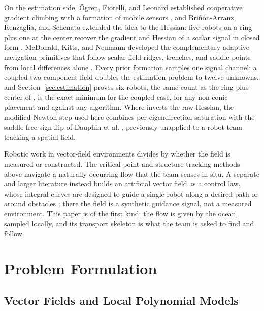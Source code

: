 \documentclass[lettersize,journal]{IEEEtran}
\begin{document}
On the estimation side, \"{O}gren, Fiorelli, and Leonard established
cooperative gradient climbing with a formation of mobile sensors
\cite{26}, and Bri\~{n}\'{o}n-Arranz, Renzaglia, and Schenato extended
the idea to the Hessian: five robots on a ring plus one at the center
recover the gradient and Hessian of a scalar signal in closed form
\cite{15}. McDonald, Kitts, and Neumann developed the complementary
adaptive-navigation primitives that follow scalar-field ridges,
trenches, and saddle points from local differences alone
\cite{27,28,29}. Every prior formation samples one signal channel; a
coupled two-component field doubles the estimation problem to twelve
unknowns, and Section~\ref{sec:estimation} proves six robots, the same
count as the ring-plus-center of \cite{15}, is the exact minimum for
the coupled case, for any non-conic placement and against any
algorithm. Where \cite{15} inverts the raw Hessian, the modified Newton
step used here combines per-eigendirection saturation with the
saddle-free sign flip of Dauphin et al. \cite{35}, previously unapplied
to a robot team tracking a spatial field.

Robotic work in vector-field environments divides by whether the field
is measured or constructed. The critical-point and structure-tracking
methods above \cite{9,10,11,12,13,14} navigate a naturally occurring
flow that the team senses in situ. A separate and larger literature
instead builds an artificial vector field as a control law, whose
integral curves are designed to guide a single robot along a desired
path \cite{37} or around obstacles \cite{38}; there the field is a
synthetic guidance signal, not a measured environment. This paper is of
the first kind: the flow is given by the ocean, sampled locally, and its
transport skeleton is what the team is asked to find and follow.

\section{Problem Formulation}
\label{sec:detj_field}

\subsection{Vector Fields and Local Polynomial Models}
\end{document}
